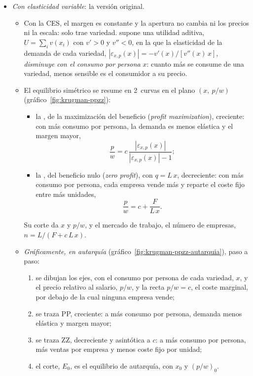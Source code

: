 \documentclass[11pt]{article}
\begin{document}
\begin{itemize}
\begin{itemize}
  \end{itemize}
\item \emph{Con elasticidad variable}: la versión original\nocite{Krugman1979Increasing}.
  \begin{itemize}
  \item Con la CES, el margen es constante y la apertura no cambia ni los precios ni la escala: solo trae variedad.  supone una utilidad aditiva, $U=\sum_iv(x_i)$ con $v'>0$ y $v''<0$, en la que la elasticidad de la demanda de cada variedad, $|\varepsilon_{x,p}(x)|=-v'(x)/[v''(x)\,x]$, \emph{disminuye con el consumo por persona} $x$: cuanto más se consume de una variedad, menos sensible es el consumidor a su precio.
  \item El equilibrio simétrico se resume en 2~curvas en el plano $(x,\ p/w)$ (gráfico~\ref{fig:krugman-ppzz}):
    \begin{itemize}
    \item la , de la maximización del beneficio (\emph{profit maximization}), creciente: con más consumo por persona, la demanda es menos elástica y el margen mayor,
    $$\frac{p}{w}=c\,\frac{|\varepsilon_{x,p}(x)|}{|\varepsilon_{x,p}(x)|-1};$$
    \item la , del beneficio nulo (\emph{zero profit}), con $q=L\,x$, decreciente: con más consumo por persona, cada empresa vende más y reparte el coste fijo entre más unidades,
    $$\frac{p}{w}=c+\frac{F}{L\,x}.$$
    \end{itemize}
    Su corte da $x$ y $p/w$, y el mercado de trabajo, el número de empresas, $n=L/(F+c\,L\,x)$.
  \item \emph{Gráficamente, en autarquía} (gráfico~\ref{fig:krugman-ppzz-autarquia}), paso a paso:
    \begin{enumerate}
    \item se dibujan los ejes, con el consumo por persona de cada variedad, $x$, y el precio relativo al salario, $p/w$, y la recta $p/w=c$, el coste marginal, por debajo de la cual ninguna empresa vende;
    \item se traza PP, creciente: a más consumo por persona, demanda menos elástica y margen mayor;
    \item se traza ZZ, decreciente y asintótica a $c$: a más consumo por persona, más ventas por empresa y menos coste fijo por unidad;
    \item el corte, $E_0$, es el equilibrio de autarquía, con $x_0$ y $(p/w)_0$.
    \end{enumerate}
  \end{itemize}
\end{itemize}
\end{document}
